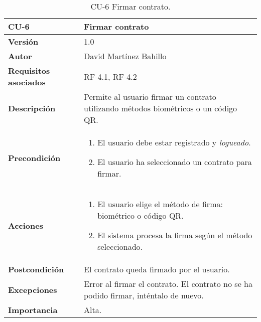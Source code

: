 \begin{table}[p]
	\centering
	\begin{tabularx}{\linewidth}{ p{} p{} }
		\toprule
		\textbf{CU-6}    & \textbf{Firmar contrato}\\
		\midrule
		\textbf{Versión}              & 1.0    \\
		\textbf{Autor}                & David Martínez Bahillo \\
		\textbf{Requisitos asociados} & RF-4.1, RF-4.2 \\
		\textbf{Descripción}          & Permite al usuario firmar un contrato utilizando métodos biométricos o un código QR. \\
		\textbf{Precondición}         &  
		\begin{enumerate}
			\def\labelenumi{\arabic{enumi}.}
			\tightlist
			\item El usuario debe estar registrado y \textit{logueado}.
			\item El usuario ha seleccionado un contrato para firmar.
		\end{enumerate}\\
		\textbf{Acciones}             &
		\begin{enumerate}
			\def\labelenumi{\arabic{enumi}.}
			\tightlist
			\item El usuario elige el método de firma: biométrico o código QR.
			\item El sistema procesa la firma según el método seleccionado.
		\end{enumerate}\\
		\textbf{Postcondición}        & El contrato queda firmado por el usuario. \\
		\textbf{Excepciones}          & Error al firmar el contrato. El contrato no se ha podido firmar, 
		inténtalo de nuevo. \\
		\textbf{Importancia}          & Alta.  \\
		\bottomrule
	\end{tabularx}
	\caption{CU-6 Firmar contrato.}
\end{table}


